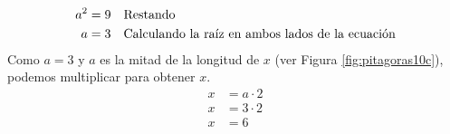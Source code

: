 \begin{solutionbox}{15cm}
\begin{minipage}{0.75\textwidth}
\begin{align*}
            a^2=9                                                                  & \text{\quad Restando}                                         \\
            a=3                                                                    & \text{\quad Calculando la raíz en ambos lados de la ecuación} \\
        \end{align*}
        Como $a=3$ y $a$ es la mitad de la longitud de $x$ (ver Figura \ref{fig:pitagoras10c}), podemos multiplicar para obtener $x$.
        \begin{align*}
            x & = a\cdot 2 \\
            x & = 3\cdot 2 \\
            x & = 6        \\
        \end{align*}
    \end{minipage}
\end{solutionbox}
